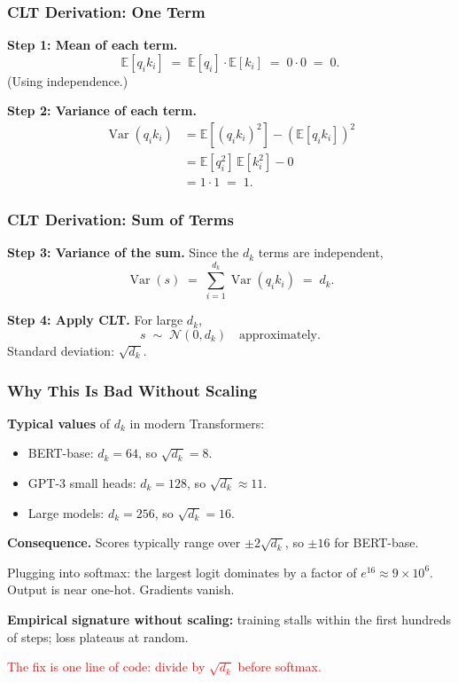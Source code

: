 \documentclass[notes,11pt, aspectratio=169]{beamer}
\DeclareMathOperator{\Var}{Var}
\newcommand{\E}{\mathbb{E}}
\begin{document}
\begin{frame}
\frametitle{CLT Derivation: One Term}

\textbf{Step 1: Mean of each term.}
\[
    \E[q_i k_i] \;=\; \E[q_i] \cdot \E[k_i] \;=\; 0 \cdot 0 \;=\; 0.
\]
(Using independence.)

\vspace{6pt}
\textbf{Step 2: Variance of each term.}
\begin{align*}
    \Var(q_i k_i) &= \E[(q_i k_i)^2] - (\E[q_i k_i])^2 \\
                  &= \E[q_i^2]\,\E[k_i^2] - 0 \\
                  &= 1 \cdot 1 \;=\; 1.
\end{align*}
\end{frame}

\begin{frame}
\frametitle{CLT Derivation: Sum of Terms}

\textbf{Step 3: Variance of the sum.} Since the $d_k$ terms are independent,
\[
    \Var(s) \;=\; \sum_{i=1}^{d_k} \Var(q_i k_i) \;=\; d_k.
\]

\vspace{4pt}
\textbf{Step 4: Apply CLT.} For large $d_k$,
\[
    s \;\sim\; \mathcal{N}(0, d_k) \quad \text{approximately}.
\]
Standard deviation: $\sqrt{d_k}$.
\end{frame}

\begin{frame}
\frametitle{Why This Is Bad Without Scaling}

\textbf{Typical values} of $d_k$ in modern Transformers:
\begin{itemize}
    \item BERT-base: $d_k = 64$, so $\sqrt{d_k} = 8$.
    \item GPT-3 small heads: $d_k = 128$, so $\sqrt{d_k} \approx 11$.
    \item Large models: $d_k = 256$, so $\sqrt{d_k} = 16$.
\end{itemize}

\vspace{8pt}
\textbf{Consequence.} Scores typically range over $\pm 2 \sqrt{d_k}$, so $\pm 16$ for BERT-base.

\vspace{4pt}
Plugging into softmax: the largest logit dominates by a factor of $e^{16} \approx 9 \times 10^6$. Output is near one-hot. Gradients vanish.

\vspace{8pt}
\textbf{Empirical signature without scaling:} training stalls within the first hundreds of steps; loss plateaus at random.

\vspace{6pt}
\textcolor{red}{The fix is one line of code: divide by $\sqrt{d_k}$ before softmax.}
\end{frame}
\end{document}
